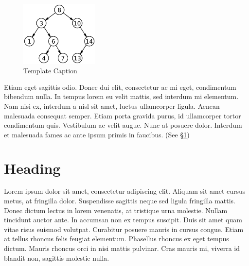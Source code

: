 \documentclass[
  11pt,
  a4paper]{article}
\begin{document}
\begin{figure}
\centering
\includegraphics[width=0.35\textwidth,height=\textheight]{images/Binary_search_tree.png}
\caption{Template Caption}
\end{figure}

Etiam eget sagittis odio. Donec dui elit, consectetur ac mi eget,
condimentum bibendum nulla. In tempus lorem eu velit mattis, sed
interdum mi elementum. Nam nisi ex, interdum a nisl sit amet, luctus
ullamcorper ligula. Aenean malesuada consequat semper. Etiam porta
gravida purus, id ullamcorper tortor condimentum quis. Vestibulum ac
velit augue. Nunc at posuere dolor. Interdum et malesuada fames ac ante
ipsum primis in faucibus. (See \protect\hyperlink{first-heading}{§1})

\hypertarget{heading}{%
\section{Heading}\label{heading}}

Lorem ipsum dolor sit amet, consectetur adipiscing elit. Aliquam sit
amet cursus metus, at fringilla dolor. Suspendisse sagittis neque sed
ligula fringilla mattis. Donec dictum lectus in lorem venenatis, at
tristique urna molestie. Nullam tincidunt auctor ante. In accumsan non
ex tempus suscipit. Duis sit amet quam vitae risus euismod volutpat.
Curabitur posuere mauris in cursus congue. Etiam at tellus rhoncus felis
feugiat elementum. Phasellus rhoncus ex eget tempus dictum. Mauris
rhoncus orci in nisi mattis pulvinar. Cras mauris mi, viverra id blandit
non, sagittis molestie nulla.

  
\end{document}
